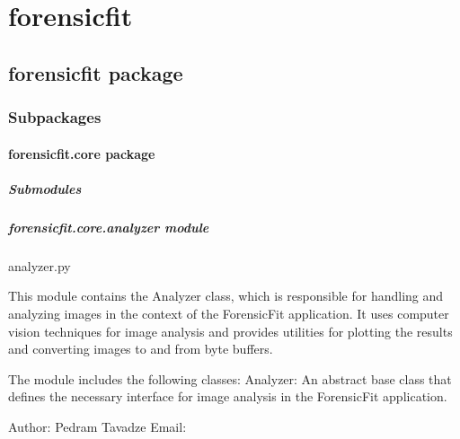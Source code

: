 \documentclass[letterpaper,10pt,english]{sphinxmanual}
\begin{document}
\section{forensicfit}
\label{\detokenize{modules:forensicfit}}\label{\detokenize{modules::doc}}
\sphinxstepscope


\subsection{forensicfit package}
\label{\detokenize{forensicfit:forensicfit-package}}\label{\detokenize{forensicfit::doc}}

\subsubsection{Subpackages}
\label{\detokenize{forensicfit:subpackages}}
\sphinxstepscope


\paragraph{forensicfit.core package}
\label{\detokenize{forensicfit.core:forensicfit-core-package}}\label{\detokenize{forensicfit.core::doc}}

\subparagraph{Submodules}
\label{\detokenize{forensicfit.core:submodules}}
\sphinxstepscope


\subparagraph{forensicfit.core.analyzer module}
\label{\detokenize{forensicfit.core.analyzer:module-forensicfit.core.analyzer}}\label{\detokenize{forensicfit.core.analyzer:forensicfit-core-analyzer-module}}\label{\detokenize{forensicfit.core.analyzer::doc}}
\sphinxAtStartPar
analyzer.py

\sphinxAtStartPar
This module contains the Analyzer class, which is responsible for
handling and analyzing images in the context of the ForensicFit
application. It uses computer vision techniques for image analysis
and provides utilities for plotting the results and converting
images to and from byte buffers.

\sphinxAtStartPar
The module includes the following classes:
\sphinxhyphen{} Analyzer: An abstract base class that defines the necessary
interface for image analysis in the ForensicFit application.

\sphinxAtStartPar
Author: Pedram Tavadze
Email: 
\end{document}
